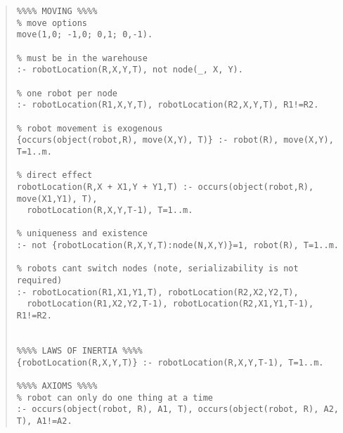 \documentclass[letterpaper]{article} %
\begin{document}
\begin{quote}
\begin{scriptsize}
\begin{verbatim}
%%%% MOVING %%%%
% move options
move(1,0; -1,0; 0,1; 0,-1).

% must be in the warehouse
:- robotLocation(R,X,Y,T), not node(_, X, Y).

% one robot per node
:- robotLocation(R1,X,Y,T), robotLocation(R2,X,Y,T), R1!=R2.

% robot movement is exogenous
{occurs(object(robot,R), move(X,Y), T)} :- robot(R), move(X,Y), T=1..m.

% direct effect
robotLocation(R,X + X1,Y + Y1,T) :- occurs(object(robot,R), move(X1,Y1), T), 
  robotLocation(R,X,Y,T-1), T=1..m.

% uniqueness and existence
:- not {robotLocation(R,X,Y,T):node(N,X,Y)}=1, robot(R), T=1..m.

% robots cant switch nodes (note, serializability is not required)
:- robotLocation(R1,X1,Y1,T), robotLocation(R2,X2,Y2,T),
  robotLocation(R1,X2,Y2,T-1), robotLocation(R2,X1,Y1,T-1), R1!=R2.


%%%% LAWS OF INERTIA %%%%
{robotLocation(R,X,Y,T)} :- robotLocation(R,X,Y,T-1), T=1..m.

%%%% AXIOMS %%%%
% robot can only do one thing at a time
:- occurs(object(robot, R), A1, T), occurs(object(robot, R), A2, T), A1!=A2.
\end{verbatim}\end{scriptsize}
\end{quote}
\end{document}
